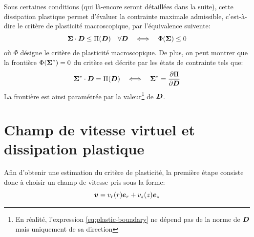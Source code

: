 \documentclass[french,english,12pt]{exam}
\begin{document}
Sous certaines conditions (qui là-encore seront détaillées dans la suite), cette dissipation plastique permet d'évaluer la contrainte maximale admissible, c'est-à-dire le critère de plasticité macroscopique, par l'équivalence suivente:
\begin{equation}
  \boldsymbol{\Sigma} \cdot \boldsymbol{D} \leq \Pi(\boldsymbol{D}) \quad \forall \boldsymbol{D} \quad \Longleftrightarrow \quad \Phi(\boldsymbol{\Sigma}) \leq 0 \label{eq2}
\end{equation}
où $\Phi$ désigne le critère de plasticité macroscopique. De plus, on peut montrer que la frontière $\Phi(\boldsymbol{\Sigma}^*)=0$ du critère est décrite par les états de contrainte tels que:
\begin{equation}
\boldsymbol{\Sigma}^*\cdot\boldsymbol{D} = \Pi(\boldsymbol{D}) \quad \Longleftrightarrow \quad \boldsymbol{\Sigma}^* = \dfrac{\partial \Pi}{\partial \boldsymbol{D}}
  \label{eq:plastic-boundary}
\end{equation}
La frontière est ainsi paramétrée par la valeur\footnote{En réalité, l'expression \eqref{eq:plastic-boundary} ne dépend pas de la norme de $\boldsymbol{D}$ mais uniquement de sa direction} de $\boldsymbol{D}$.

\section{Champ de vitesse virtuel et dissipation plastique}

Afin d'obtenir une estimation du critère de plasticité, la première étape consiste donc à choisir un champ de vitesse pris sous la forme:
\begin{equation}
  \boldsymbol{v} = v_r(r) \boldsymbol{e}_r + v_z(z) \boldsymbol{e}_z \label{eq:champ-vitesse}
\end{equation}
\end{document}
